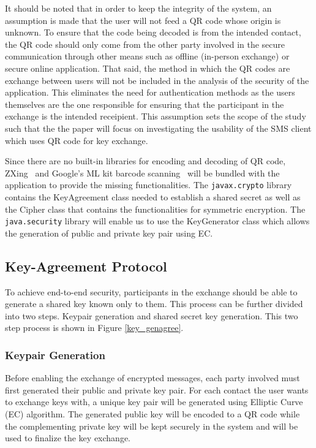 \documentclass[journal]{./IEEE/IEEEtran}
\begin{document}
It should be noted that in order to keep the integrity of the system,
an assumption is made that the user will not feed a QR code
whose origin is unknown. To ensure that the code being decoded is from the
intended contact, the QR code should only come from the other party involved
in the secure communication through other means such as offline
(in-person exchange) or secure online application. That said, the method in
which the QR codes are exchange between users will not be included in the
analysis of the security of the application. This eliminates the need
for authentication methods as the users themselves are the one responsible
for ensuring that the participant in the exchange is the intended receipient.
This assumption sets the scope of the study such that the the paper will focus
on investigating the usability of the SMS client which uses QR code for
key exchange.

Since there are no built-in libraries for encoding and decoding of QR code,
ZXing~\cite{zxing} and Google's ML kit barcode scanning~\cite{mlkit}
will be bundled with the application to provide the missing functionalities.
The \lstinline{javax.crypto} library contains the KeyAgreement class needed to
establish a shared secret as well as the Cipher class that contains the
functionalities for symmetric encryption. The \lstinline{java.security} library
will enable us to use the KeyGenerator class which allows the generation of
public and private key pair using EC.


\subsection{Key-Agreement Protocol}
To achieve end-to-end security, participants in the exchange should be able to
generate a shared key known only to them. This process can be further divided
into two steps. Keypair generation and shared secret key generation. This two
step process is shown in Figure \ref{key_genagree}.

\subsubsection{Keypair Generation}
Before enabling the exchange of encrypted messages, each party involved
must first generated their public and private key pair. For each contact the
user wants to exchange keys with, a unique key pair will be generated
using Elliptic Curve (EC) algorithm.
The generated public key will be encoded to a QR code while the complementing
private key will be kept securely in the system and will be used to finalize
the key exchange.
\end{document}

